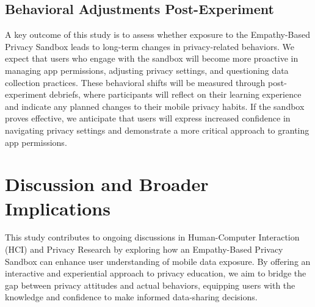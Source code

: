 \documentclass[acmlarge, nonacm]{acmart}
\begin{document}
\subsection{Behavioral Adjustments Post-Experiment}
A key outcome of this study is to assess whether exposure to the Empathy-Based Privacy Sandbox leads to long-term changes in privacy-related behaviors. We expect that users who engage with the sandbox will become more proactive in managing app permissions, adjusting privacy settings, and questioning data collection practices. These behavioral shifts will be measured through post-experiment debriefs, where participants will reflect on their learning experience and indicate any planned changes to their mobile privacy habits. If the sandbox proves effective, we anticipate that users will express increased confidence in navigating privacy settings and demonstrate a more critical approach to granting app permissions.


\section{Discussion and Broader Implications}

This study contributes to ongoing discussions in Human-Computer Interaction (HCI) and Privacy Research by exploring how an Empathy-Based Privacy Sandbox can enhance user understanding of mobile data exposure. By offering an interactive and experiential approach to privacy education, we aim to bridge the gap between privacy attitudes and actual behaviors, equipping users with the knowledge and confidence to make informed data-sharing decisions.
\end{document}
